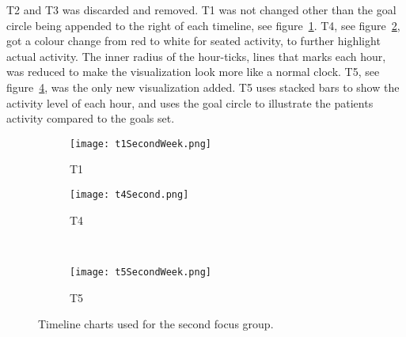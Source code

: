 T2 and T3 was discarded and removed. T1 was not changed other than the goal circle being appended to the right of each timeline, see figure~\ref{fig:t1}. T4, see figure~\ref{fig:t4}, got a colour change from red to white for seated activity, to further highlight actual activity. The inner radius of the hour-ticks, lines that marks each hour, was reduced to make the visualization look more like a normal clock. T5, see figure~\ref{fig:t5}, was the only new visualization added. T5 uses stacked bars to show the activity level of each hour, and uses the goal circle to illustrate the patients activity compared to the goals set.

\begin{figure}[h!]
  \centering
  \begin{subfigure}[b]{0.6\textwidth}
    \centering
    \texttt{[image: t1SecondWeek.png]}
    \caption{T1}
    \label{fig:t1}
  \end{subfigure}
  \begin{subfigure}[b]{0.35\textwidth}
    \centering
    \texttt{[image: t4Second.png]}
    \caption{T4}
    \label{fig:t4}
  \end{subfigure}
  \\
  \begin{subfigure}[b]{0.95\textwidth}
    \centering
    \texttt{[image: t5SecondWeek.png]}
    \caption{T5}
    \label{fig:t5}
  \end{subfigure}
  \caption{Timeline charts used for the second focus group.}
\end{figure}
